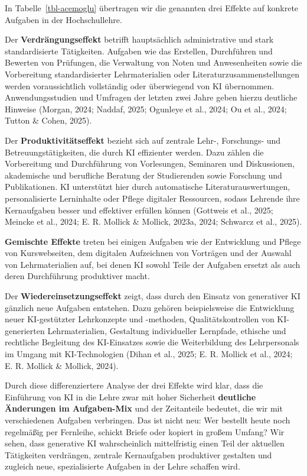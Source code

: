 \documentclass[
  ngerman,
  letterpaper,
  DIV=11]{scrreprt}
\begin{document}
In Tabelle~\ref{tbl-acemoglu} übertragen wir die genannten drei Effekte
auf konkrete Aufgaben in der Hochschullehre.

Der \textbf{Verdrängungseffekt} betrifft hauptsächlich administrative
und stark standardisierte Tätigkeiten. Aufgaben wie das Erstellen,
Durchführen und Bewerten von Prüfungen, die Verwaltung von Noten und
Anwesenheiten sowie die Vorbereitung standardisierter Lehrmaterialien
oder Literaturzusammenstellungen werden voraussichtlich vollständig oder
überwiegend von KI übernommen. Anwendungsstudien und Umfragen der
letzten zwei Jahre geben hierzu deutliche Hinweise (Morgan, 2024;
Naddaf, 2025; Ogunleye et al., 2024; Ou et al., 2024; Tutton \& Cohen,
2025).

Der \textbf{Produktivitätseffekt} bezieht sich auf zentrale Lehr-,
Forschungs- und Betreuungstätigkeiten, die durch KI effizienter werden.
Dazu zählen die Vorbereitung und Durchführung von Vorlesungen, Seminaren
und Diskussionen, akademische und berufliche Beratung der Studierenden
sowie Forschung und Publikationen. KI unterstützt hier durch
automatische Literaturauswertungen, personalisierte Lerninhalte oder
Pflege digitaler Ressourcen, sodass Lehrende ihre Kernaufgaben besser
und effektiver erfüllen können (Gottweis et al., 2025; Meincke et al.,
2024; E. R. Mollick \& Mollick, 2023a, 2024; Schwarcz et al., 2025).

\textbf{Gemischte Effekte} treten bei einigen Aufgaben wie der
Entwicklung und Pflege von Kurswebseiten, dem digitalen Aufzeichnen von
Vorträgen und der Auswahl von Lehrmaterialien auf, bei denen KI sowohl
Teile der Aufgaben ersetzt als auch deren Durchführung produktiver
macht.

Der \textbf{Wiedereinsetzungseffekt} zeigt, dass durch den Einsatz von
generativer KI gänzlich neue Aufgaben entstehen. Dazu gehören
beispielsweise die Entwicklung neuer KI-gestützter Lehrkonzepte und
-methoden, Qualitätskontrollen von KI-generierten Lehrmaterialien,
Gestaltung individueller Lernpfade, ethische und rechtliche Begleitung
des KI-Einsatzes sowie die Weiterbildung des Lehrpersonals im Umgang mit
KI-Technologien (Dihan et al., 2025; E. R. Mollick et al., 2024; E. R.
Mollick \& Mollick, 2024).

Durch diese differenziertere Analyse der drei Effekte wird klar, dass
die Einführung von KI in die Lehre zwar mit hoher Sicherheit
\textbf{deutliche Änderungen im Aufgaben-Mix} und der Zeitanteile
bedeutet, die wir mit verschiedenen Aufgaben verbringen. Das ist nicht
neu: Wer bestellt heute noch regelmäßig per Fernleihe, schickt Briefe
oder kopiert in großem Umfang? Wir sehen, dass generative KI
wahrscheinlich mittelfristig einen Teil der aktuellen Tätigkeiten
verdrängen, zentrale Kernaufgaben produktiver gestalten und zugleich
neue, spezialisierte Aufgaben in der Lehre schaffen wird.
\end{document}
